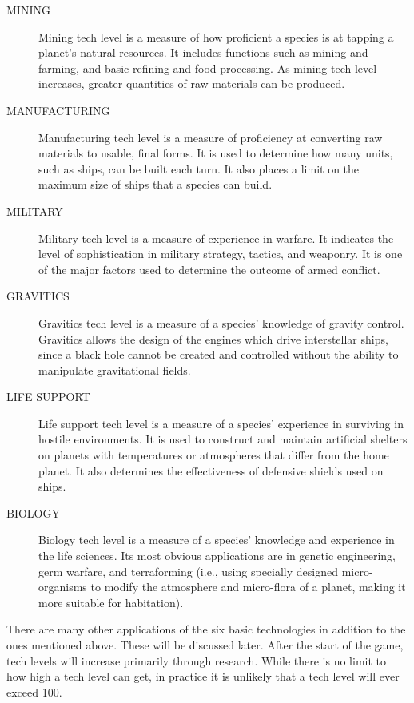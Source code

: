 \documentclass[10pt,titlepage]{article}
\begin{document}
\begin{description}
 

\item[MINING]   Mining tech level is a measure of how proficient
			a species is at tapping a planet's natural resources.
			It includes functions such as mining and farming,
			and basic refining and food processing. As mining tech
			level increases, greater quantities of raw materials
			can be produced.

\item[MANUFACTURING]	Manufacturing tech level is a measure of proficiency
			at converting raw materials to usable, final forms.
			It is used to determine how many units, such as ships,
			can be built each turn. It also places a limit on
			the maximum size of ships that a species can build.

\item[MILITARY]	Military tech level is a measure of experience in
			warfare. It indicates the level of sophistication
			in military strategy, tactics, and weaponry.  It
			is one of the major factors used to determine the
			outcome of armed conflict.

\item[GRAVITICS]	Gravitics tech level is a measure of a species'
			knowledge of gravity control.  Gravitics allows
			the design of the engines which drive interstellar
			ships, since a black hole cannot be created and
			controlled without the ability to manipulate
			gravitational fields.

\item[LIFE SUPPORT]	Life support tech level is a measure of a species'
			experience in surviving in hostile environments.
			It is used to construct and maintain artificial
			shelters on planets with temperatures or atmospheres
			that differ from the home planet.  It also determines
			the effectiveness of defensive shields used on ships.

\item[BIOLOGY]		Biology tech level is a measure of a species'
			knowledge and experience in the life sciences.  Its
			most obvious applications are in genetic engineering,
			germ warfare, and terraforming (i.e., using specially
			designed micro-organisms to modify the atmosphere
			and micro-flora of a planet, making it more suitable
			for habitation).
 \end{description}
There are many other applications of the six basic technologies in addition to
the ones mentioned above.  These will be discussed later.  After the start of
the game, tech levels will increase primarily through research.  While there is
no limit to how high a tech level can get, in practice it is unlikely that a
tech level will ever exceed 100.
\end{document}
